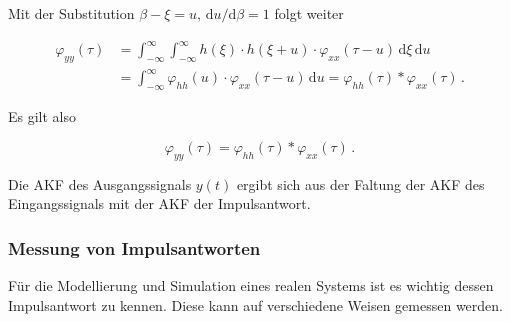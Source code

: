 Mit der Substitution $\beta - \xi = u$, $\mathrm{d}u/\mathrm{d}\beta = 1$ folgt weiter

\begin{align*}
\varphi_{yy}(\tau) &= \int_{-\infty}^{\infty}\int_{-\infty}^{\infty} h(\xi)\cdot h(\xi + u)\cdot \varphi_{xx}(\tau - u)\,\mathrm{d}\xi\,\mathrm{d}u \\
&= \int_{-\infty}^{\infty} \varphi_{hh}(u)\cdot \varphi_{xx}(\tau - u)\,\mathrm{d}u = \varphi_{hh}(\tau) * \varphi_{xx}(\tau)\,.
\end{align*}

Es gilt also

$$
\varphi_{yy}(\tau) = \varphi_{hh}(\tau) * \varphi_{xx}(\tau)\,.
$$

Die AKF des Ausgangssignals $y(t)$ ergibt sich aus der Faltung der AKF des Eingangssignals mit der AKF der Impulsantwort.

\subsubsection*{Messung von Impulsantworten}

Für die Modellierung und Simulation eines realen Systems ist es wichtig dessen Impulsantwort zu kennen. Diese kann auf verschiedene Weisen gemessen werden.

